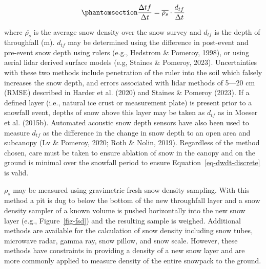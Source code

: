 \documentclass[
  letterpaper,
]{tex/uofsthesis-cs}
\begin{document}
\begin{equation}\phantomsection\label{eq-sweins}{
\frac{\Delta tf}{\Delta t} = \overline{\rho_s} \cdot \frac{d_{ tf}}{\Delta t}
}\end{equation}

where \(\overline{\rho_s}\) is the average snow density over the snow
survey and \(d_{tf}\) is the depth of throughfall (m). \(d_{tf}\) may be
determined using the difference in post-event and pre-event snow depth
using rulers (e.g., Hedstrom \& Pomeroy, 1998), or using aerial lidar
derived surface models (e.g, Staines \& Pomeroy, 2023). Uncertainties
with these two methods include penetration of the ruler into the soil
which falsely increases the snow depth, and errors associated with lidar
methods of 5---20 cm (RMSE) described in Harder et al. (2020) and
Staines \& Pomeroy (2023). If a defined layer (i.e., natural ice crust
or measurement plate) is present prior to a snowfall event, depths of
snow above this layer may be taken as \(d_{tf}\) as in Moeser et al.
(2015b). Automated acoustic snow depth sensors have also been used to
measure \(d_{tf}\) as the difference in the change in snow depth to an
open area and subcanopy (Lv \& Pomeroy, 2020; Roth \& Nolin, 2019).
Regardless of the method chosen, care must be taken to ensure ablation
of snow in the canopy and on the ground is minimal over the snowfall
period to ensure Equation~\ref{eq-dwdt-discrete} is valid.

\(\rho_s\) may be measured using gravimetric fresh snow density
sampling. With this method a pit is dug to below the bottom of the new
throughfall layer and a snow density sampler of a known volume is pushed
horizontally into the new snow layer (e.g., Figure~\ref{fig-fsd}) and
the resulting sample is weighed. Additional methods are available for
the calculation of snow density including snow tubes, microwave radar,
gamma ray, snow pillow, and snow scale. However, these methods have
constraints in providing a density of a new snow layer and are more
commonly applied to measure density of the entire snowpack to the
ground.
\end{document}
